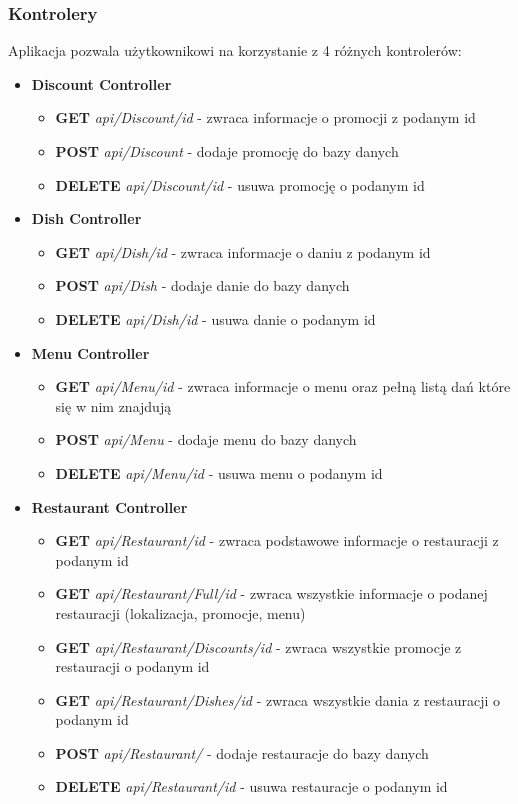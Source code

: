 \documentclass{article}
\begin{document}
		\subsubsection{Kontrolery}
		Aplikacja pozwala użytkownikowi na korzystanie z 4 różnych kontrolerów:
			\begin{itemize}
				\item \textbf{Discount Controller} 
					\begin{itemize}
						\item \textbf{GET} \textit{api/Discount/id}	- zwraca informacje o promocji z podanym id	
						\item \textbf{POST} \textit{api/Discount} - dodaje promocję do bazy danych
						\item \textbf{DELETE} \textit{api/Discount/id}	 - usuwa promocję o podanym id				
					\end{itemize}

				\item \textbf{Dish Controller}
					\begin{itemize}
						\item \textbf{GET} \textit{api/Dish/id} - zwraca informacje o daniu z podanym id
						\item \textbf{POST} \textit{api/Dish} - dodaje danie do bazy danych
						\item \textbf{DELETE} \textit{api/Dish/id} - usuwa danie o podanym id
					\end{itemize}
					
				\item \textbf{Menu Controller}
					\begin{itemize} 
						\item \textbf{GET} \textit{api/Menu/id} - zwraca informacje o menu oraz pełną listą dań które się w nim znajdują
						\item \textbf{POST} \textit{api/Menu} - dodaje menu do bazy danych
						\item \textbf{DELETE} \textit{api/Menu/id} - usuwa menu o podanym id
					\end{itemize}
					
				\item \textbf{Restaurant Controller}
					\begin{itemize}
						\item \textbf{GET} \textit{api/Restaurant/id} - zwraca podstawowe informacje o restauracji z podanym id 
						\item \textbf{GET} \textit{api/Restaurant/Full/id} - zwraca wszystkie informacje o podanej restauracji (lokalizacja, promocje, menu)
						\item \textbf{GET} \textit{api/Restaurant/Discounts/id} - zwraca wszystkie promocje z restauracji o podanym id
						\item \textbf{GET} \textit{api/Restaurant/Dishes/id} - zwraca wszystkie dania z restauracji o podanym id
						\item \textbf{POST} \textit{api/Restaurant/} - dodaje restauracje do bazy danych
						\item \textbf{DELETE} \textit{api/Restaurant/id} - usuwa restauracje o podanym id 
					\end{itemize}
			\end{itemize}
\end{document}
